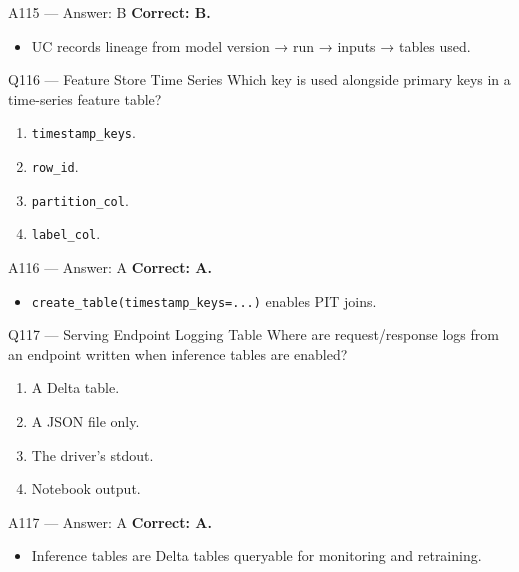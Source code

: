 \documentclass[aspectratio=169,9pt]{beamer}
\begin{document}
	\begin{frame}{A115 --- Answer: B}
		\textbf{Correct: B.}
		\begin{itemize}
			\item UC records lineage from model version → run → inputs → tables used.
		\end{itemize}
	\end{frame}
	
	\begin{frame}{Q116 --- Feature Store Time Series}
		Which key is used alongside primary keys in a time-series feature table?
		\begin{enumerate}[label=\Alph*.]
			\item \texttt{timestamp\_keys}.
			\item \texttt{row\_id}.
			\item \texttt{partition\_col}.
			\item \texttt{label\_col}.
		\end{enumerate}
	\end{frame}
	
	\begin{frame}{A116 --- Answer: A}
		\textbf{Correct: A.}
		\begin{itemize}
			\item \texttt{create\_table(timestamp\_keys=...)} enables PIT joins.
		\end{itemize}
	\end{frame}
	
	\begin{frame}{Q117 --- Serving Endpoint Logging Table}
		Where are request/response logs from an endpoint written when inference tables are enabled?
		\begin{enumerate}[label=\Alph*.]
			\item A Delta table.
			\item A JSON file only.
			\item The driver's stdout.
			\item Notebook output.
		\end{enumerate}
	\end{frame}
	
	\begin{frame}{A117 --- Answer: A}
		\textbf{Correct: A.}
		\begin{itemize}
			\item Inference tables are Delta tables queryable for monitoring and retraining.
		\end{itemize}
	\end{frame}
	
\end{document}
